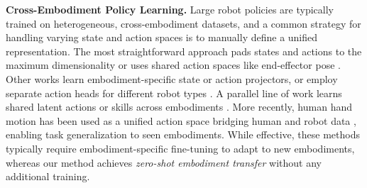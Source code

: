 \vspace{5pt}
\noindent\textbf{Cross-Embodiment Policy Learning.} Large robot policies are typically trained on heterogeneous, cross-embodiment datasets, and a common strategy for handling varying state and action spaces is to manually define a unified representation. The most straightforward approach pads states and actions to the maximum dimensionality or uses shared action spaces like end-effector pose \cite{black2024pi0visionlanguageactionflowmodel, kim2024openvlaopensourcevisionlanguageactionmodel, zheng2025xvlasoftpromptedtransformerscalable}. Other works learn embodiment-specific state or action projectors, or employ separate action heads for different robot types \cite{wang2024scalingproprioceptivevisuallearningheterogeneous, doshi2024scalingcrossembodiedlearningpolicy, octomodelteam2024octoopensourcegeneralistrobot, yang2024pushinglimitscrossembodimentlearning, nvidia2025gr00tn1openfoundation}. A parallel line of work learns shared latent actions or skills across embodiments \cite{ye2025latentactionpretrainingvideos, bu2025univlalearningacttaskcentric, Zheng_2025_CVPR, Chen_2025_ICCV, xu2023xskillcrossembodimentskill, wang2024crossembodimentrobotmanipulationskill}. More recently, human hand motion has been used as a unified action space bridging human and robot data \cite{luo2026beingh05scalinghumancentricrobot,yang2025egovlalearningvisionlanguageactionmodels}, enabling task generalization to seen embodiments. While effective, these methods typically require embodiment-specific fine-tuning to adapt to new embodiments, whereas our method achieves \emph{zero-shot embodiment transfer} without any additional training.

